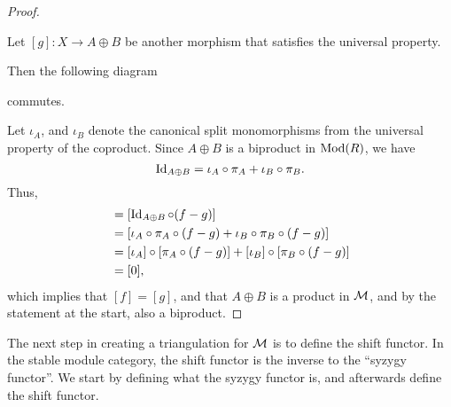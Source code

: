 \begin{proof}
\begin{center}
    \end{center}
    Let \( [g]: X \to A \oplus B \) be another morphism that satisfies the universal property.

    Then the following diagram
    \begin{center}
    \end{center}
    commutes.

    Let \( \iota_A \), and \( \iota_B \) denote the canonical split monomorphisms from the universal property of the coproduct. Since \( A \oplus B \) is a biproduct in \( \operatorname{Mod}(R) \), we have
    \[
        \operatorname{Id}_{A \oplus B} = \iota_A \circ \pi_A + \iota_B \circ \pi_B.
    \]
    Thus,
    \begin{align*}
        [f - g] &= [\Id_{A \oplus B} \circ (f - g)] \\
        &= [\iota_A \circ \pi_A \circ (f - g) + \iota_B \circ \pi_B \circ (f - g)] \\
        &= [\iota_A] \circ [\pi_A \circ (f - g)] + [\iota_B] \circ [\pi_B \circ (f - g)] \\
        &= [0],
    \end{align*}
    which implies that \( [f] = [g] \), and that \( A \oplus B \) is a product in \( {\mathcal{M}} \), and by the statement at the start, also a biproduct.
\end{proof}

The next step in creating a triangulation for \( {\mathcal{M}} \) is to define the shift functor. In the stable module category, the shift functor is the inverse to the ``syzygy functor''. We start by defining what the syzygy functor is, and afterwards define the shift functor.

